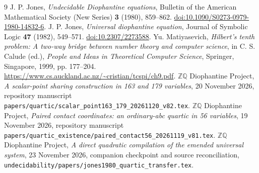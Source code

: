 \documentclass[11pt]{article}
\begin{document}
\begin{thebibliography}{9}
 J. P. Jones, \emph{Undecidable Diophantine equations},
Bulletin of the American Mathematical Society (New Series)
\textbf{3} (1980), 859--862.
\href{https://doi.org/10.1090/S0273-0979-1980-14832-6}{doi:10.1090/S0273-0979-1980-14832-6}.
 J. P. Jones, \emph{Universal diophantine equation},
Journal of Symbolic Logic \textbf{47} (1982), 549--571.
\href{https://doi.org/10.2307/2273588}{doi:10.2307/2273588}.
 Yu. Matiyasevich, \emph{Hilbert's tenth problem: A two-way
bridge between number theory and computer science}, in C. S. Calude (ed.),
\emph{People and Ideas in Theoretical Computer Science}, Springer,
Singapore, 1999, pp. 177--204.
\url{https://www.cs.auckland.ac.nz/~cristian/tcspi/ch9.pdf}.
 \(\mathbb Z\mathbb Q\) Diophantine Project,
\emph{A scalar-point sharing construction in 163 and 179 variables},
20 November 2026, repository manuscript
\nolinkurl{papers/quartic/scalar_point163_179_20261120_v82.tex}.
 \(\mathbb Z\mathbb Q\) Diophantine Project,
\emph{Paired contact coordinates: an ordinary-abc quartic in 56 variables},
19 November 2026, repository manuscript
\nolinkurl{papers/quartic_existence/paired_contact56_20261119_v81.tex}.
 \(\mathbb Z\mathbb Q\) Diophantine Project,
\emph{A direct quadratic compilation of the emended universal system},
23 November 2026, companion checkpoint and source reconciliation,
\nolinkurl{undecidability/papers/jones1980_quartic_transfer.tex}.
\end{thebibliography}
\end{document}
